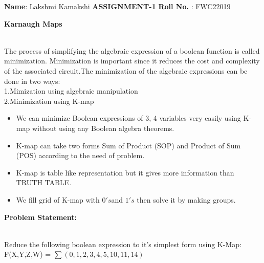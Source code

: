 \documentclass[10pt,a4paper]{report}
\begin{document}
\raggedright \textbf{Name}:\hspace{1mm} Lakshmi Kamakshi\hspace{3cm} \Large \textbf{ASSIGNMENT-1}\hspace{2.5cm} %
\normalsize \textbf{Roll No.} :\hspace{1mm} FWC22019\vspace{2cm}
\begin{multicols}{2}
\hspace{7.5cm} \textbf{Karnaugh Maps}\vspace{0.5cm}
\raggedright \\The process of simplifying the algebraic expression of a boolean function is called minimization. Minimization is important since it reduces the cost and complexity of the associated circuit.The minimization of the algebraic expressions can be done in two ways:\\1.Mimization using algebraic manipulation\\2.Minimization using K-map \vspace{3mm} \\ \begin{itemize}


\item We can minimize Boolean expressions of 3, 4 variables very easily using K-map without using any Boolean algebra theorems.
\item K-map can take two forms Sum of Product (SOP) and Product of Sum (POS) according to the need of problem. 
\item K-map is table like representation but it gives more information than TRUTH TABLE.
\item We fill grid of K-map with $0's $and $1's$ then solve it by making groups.\vspace{2mm}
\end{itemize}
\raggedright \textbf{Problem Statement:}\vspace{2mm}
\raggedright \\Reduce the following boolean expression to it's simplest form using K-Map:
\center F(X,Y,Z,W) = $\sum(0,1,2,3,4,5,10,11,14)$
\vspace{5mm}



\newcommand{\implicantsol}[3][0]{
    \draw[rounded corners=3pt, fill=#3, opacity=0.3] ($(#2.north west)+(135:#1)$) rectangle ($(#2.south east)+(-45:#1)$);
    }



\end{multicols}
\end{document}
